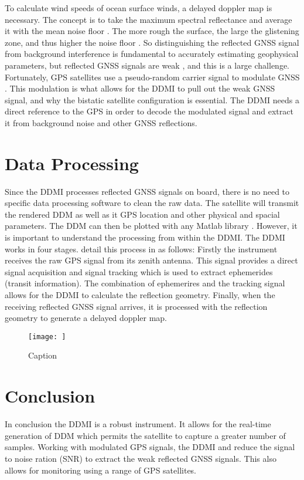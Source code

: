 \documentclass[12pt]{article}
\begin{document}
To calculate wind speeds of ocean surface winds, a delayed doppler map is necessary. The concept is to take the maximum spectral reflectance and average it with the mean noise floor \cite{GNSS_Signal_Properties}. The more rough the surface, the large the glistening zone, and thus higher the noise floor \cite{DDMI_Overview}. So distinguishing the reflected GNSS signal from background interference is fundamental to accurately estimating geophysical parameters, but reflected GNSS signals are weak \cite{SGR-ReSi_Application}, and this is a large challenge. Fortunately, GPS satellites use a pseudo-random carrier signal to modulate GNSS \cite{GNSS_Signal_Properties}. This modulation is what allows for the DDMI to pull out the weak GNSS signal, and why the bistatic satellite configuration is essential. The DDMI needs a direct reference to the GPS in order to decode the modulated signal and extract it from background noise and other GNSS reflections.

\section{Data Processing}

Since the DDMI processes reflected GNSS signals on board, there is no need to specific data processing software to clean the raw data. The satellite will transmit the rendered DDM as well as it GPS location and other physical and spacial parameters. The DDM can then be plotted with any Matlab library \cite{SGR-ReSi_Application}. However, it is important to understand the processing from within the DDMI. The DDMI works in four stages. \citeauthor{SGR-ReSi_Application} detail this process in as follows: Firstly the instrument receives the raw GPS signal from its zenith antenna. This signal provides a direct signal acquisition and signal tracking which is used to extract ephemerides (transit information). The combination of ephemerires and the tracking signal allows for the DDMI to calculate the reflection geometry. Finally, when the receiving reflected GNSS signal arrives, it is processed with the reflection geometry to generate a delayed doppler map. 

\begin{figure}
    \centering
    \texttt{[image: ]}
    \caption{Caption}
    \label{fig:Delayed Doppler Map}
\end{figure}


\section{Conclusion}
In conclusion the DDMI is a robust instrument. It allows for the real-time generation of DDM which permits the satellite to capture a greater number of samples. Working with modulated GPS signals, the DDMI and reduce the signal to noise ration (SNR) to extract the weak reflected GNSS signals. This also allows for monitoring using a range of GPS satellites. 
\end{document}
